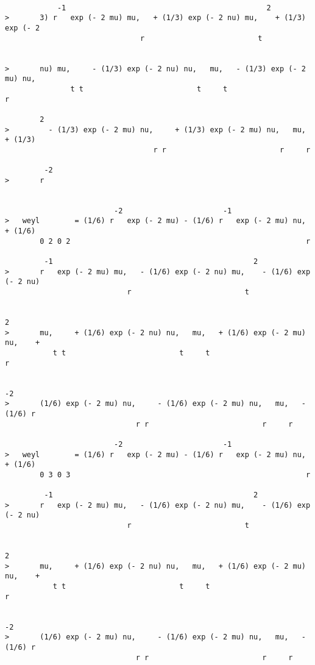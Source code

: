 \begin{verbatim}

            -1                                              2
>       3) r   exp (- 2 mu) mu,   + (1/3) exp (- 2 nu) mu,    + (1/3) exp (- 2
                               r                          t


>       nu) mu,     - (1/3) exp (- 2 nu) nu,   mu,   - (1/3) exp (- 2 mu) nu,
               t t                          t     t                          r

        2
>         - (1/3) exp (- 2 mu) nu,     + (1/3) exp (- 2 mu) nu,   mu,   + (1/3)
                                  r r                          r     r

         -2
>       r


                         -2                       -1
>   weyl        = (1/6) r   exp (- 2 mu) - (1/6) r   exp (- 2 mu) nu,   + (1/6)
        0 2 0 2                                                      r

         -1                                              2
>       r   exp (- 2 mu) mu,   - (1/6) exp (- 2 nu) mu,    - (1/6) exp (- 2 nu)
                            r                          t

                                                                           2
>       mu,     + (1/6) exp (- 2 nu) nu,   mu,   + (1/6) exp (- 2 mu) nu,    +
           t t                          t     t                          r

                                                                             -2
>       (1/6) exp (- 2 mu) nu,     - (1/6) exp (- 2 mu) nu,   mu,   - (1/6) r
                              r r                          r     r

                         -2                       -1
>   weyl        = (1/6) r   exp (- 2 mu) - (1/6) r   exp (- 2 mu) nu,   + (1/6)
        0 3 0 3                                                      r

         -1                                              2
>       r   exp (- 2 mu) mu,   - (1/6) exp (- 2 nu) mu,    - (1/6) exp (- 2 nu)
                            r                          t

                                                                           2
>       mu,     + (1/6) exp (- 2 nu) nu,   mu,   + (1/6) exp (- 2 mu) nu,    +
           t t                          t     t                          r

                                                                             -2
>       (1/6) exp (- 2 mu) nu,     - (1/6) exp (- 2 mu) nu,   mu,   - (1/6) r
                              r r                          r     r


\end{verbatim}
